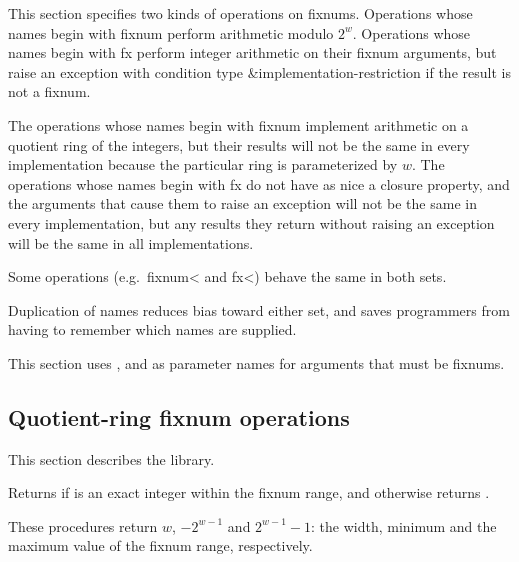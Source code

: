 This section specifies two kinds of operations on fixnums.  Operations
whose names begin with {\cf fixnum} perform arithmetic modulo
$2^{w}$.  Operations whose names begin with {\cf fx}
perform integer arithmetic on their fixnum arguments, but raise an
exception with condition type {\cf\&implementation-restriction} 
if the result is not a fixnum.

\begin{rationale}
The operations whose names begin with {\cf fixnum}
implement arithmetic on a quotient ring of the integers,
but their results will not be the same in every implementation
because the particular ring is parameterized by $w$.
The operations whose names begin with {\cf fx} do
not have as nice a closure property, and the arguments that
cause them to raise an exception will not be the same in every
implementation, but any results they return without
raising an exception will be the same in all implementations.
\end{rationale}

Some operations (e.g.\ {\cf fixnum<} and {\cf fx<}) behave the same in
both sets.

\begin{rationale}
Duplication of names reduces bias toward either set,
and saves programmers from having to remember which
names are supplied.
\end{rationale}

This section uses ,  and  as parameter
names for arguments that must be fixnums.

\subsection{Quotient-ring fixnum operations}

This section describes the  library.

\begin{entry}{%
}

Returns \schtrue{} if  is an exact
integer within the fixnum range, and
otherwise returns \schfalse{}.
\end{entry}

\begin{entry}{%
}

These procedures return $w$,
$-2^{w-1}$ and $2^{w-1} - 1$: the
width, minimum and the maximum value of the fixnum range, respectively.
\end{entry}

